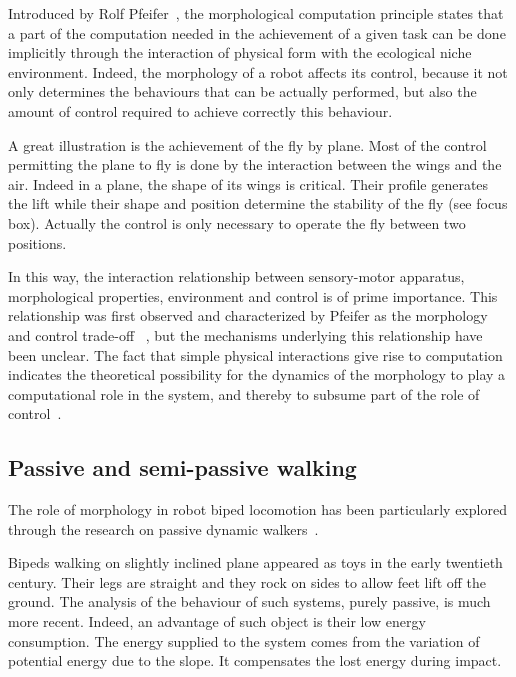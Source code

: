 Introduced by Rolf Pfeifer~\cite{pfeifer2005morphological}, the morphological computation principle states that a part of the computation needed in the achievement of a given task can be done implicitly through the interaction of physical form with the ecological niche environment.
Indeed, the morphology of a robot affects its control, because it not only determines the behaviours that can be actually performed, but also the amount of control required to achieve correctly this behaviour.

A great illustration is the achievement of the fly by plane. Most of the control permitting the plane to fly is done by the interaction between the wings and the air. Indeed in a plane, the shape of its wings is critical. Their profile generates the lift while their shape and position determine the stability of the fly (see focus box). Actually the control is only necessary to operate the fly between two positions.

In this way, the interaction relationship between sensory-motor apparatus, morphological properties, environment and control is of prime importance. This relationship was first observed and characterized by Pfeifer as the morphology and control trade-off ~\cite{pfeifer2001understanding}, but the mechanisms underlying this relationship have been unclear. The fact that simple physical interactions give rise to computation indicates the theoretical possibility for the dynamics of the morphology to play a computational role in the system, and thereby to subsume part of the role of control~\cite{paulinvestigation}.


\subsection{Passive and semi-passive walking} %

The role of morphology in robot biped locomotion has been particularly explored through the research on passive dynamic walkers~\cite{wisse2007passive}.

Bipeds walking on slightly inclined plane appeared as toys in the early twentieth century. Their legs are straight and they rock on sides to allow feet lift off the ground. The analysis of the behaviour of such systems, purely passive, is much more recent. Indeed, an advantage of such object is their low energy consumption. The energy supplied to the system comes from the variation of potential energy due to the slope. It compensates the lost energy during impact.


